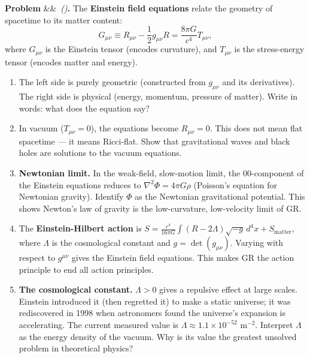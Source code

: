 \documentclass[12pt,a4paper]{article}
\newcounter{problem}
\newenvironment{problem}[1][]{\refstepcounter{problem}\par\vspace{6pt}\noindent\textbf{\color{MidBlue}Problem \theproblem}\ifx&#1&\else\ \textit{(#1)}\fi\textbf{.}\enskip}{\par\vspace{4pt}}
\begin{document}
\begin{problem}
\label{prob:einstein}
The \textbf{Einstein field equations} relate the geometry of spacetime to its matter content:
\[
  G_{\mu\nu} \equiv R_{\mu\nu} - \frac{1}{2}g_{\mu\nu}R = \frac{8\pi G}{c^4}T_{\mu\nu},
\]
where $G_{\mu\nu}$ is the Einstein tensor (encodes curvature), and $T_{\mu\nu}$ is the stress-energy tensor (encodes matter and energy).
\begin{enumerate}[label=(\alph*),topsep=2pt]
  \item The left side is purely geometric (constructed from $g_{\mu\nu}$ and its derivatives). The right side is physical (energy, momentum, pressure of matter). Write in words: what does the equation say?
  \item In vacuum ($T_{\mu\nu}=0$), the equations become $R_{\mu\nu}=0$. This does not mean flat spacetime --- it means Ricci-flat. Show that gravitational waves and black holes are solutions to the vacuum equations.
  \item \textbf{Newtonian limit.} In the weak-field, slow-motion limit, the $00$-component of the Einstein equations reduces to $\nabla^2\Phi=4\pi G\rho$ (Poisson's equation for Newtonian gravity). Identify $\Phi$ as the Newtonian gravitational potential. This shows Newton's law of gravity is the low-curvature, low-velocity limit of GR.
  \item The \textbf{Einstein-Hilbert action} is $S = \frac{c^4}{16\pi G}\int(R-2\Lambda)\sqrt{-g}\,d^4x + S_{\text{matter}}$, where $\Lambda$ is the cosmological constant and $g=\det(g_{\mu\nu})$. Varying with respect to $g^{\mu\nu}$ gives the Einstein field equations. This makes GR the action principle to end all action principles.
  \item \textbf{The cosmological constant.} $\Lambda>0$ gives a repulsive effect at large scales. Einstein introduced it (then regretted it) to make a static universe; it was rediscovered in 1998 when astronomers found the universe's expansion is accelerating. The current measured value is $\Lambda\approx 1.1\times 10^{-52}$ m$^{-2}$. Interpret $\Lambda$ as the energy density of the vacuum. Why is its value the greatest unsolved problem in theoretical physics?
\end{enumerate}
\end{problem}
\end{document}
